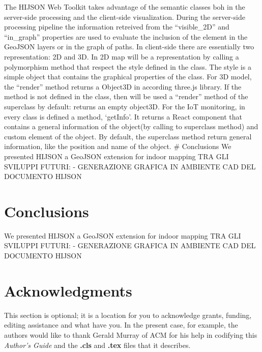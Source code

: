 \documentclass{sig-alternate}
\begin{document}
The HIJSON Web Toolkit takes advantage of the semantic classes boh in
the server-side processing and the client-side visualization. During the
server-side processing pipeline the information retreived from the
``visible\_2D'' and ``in\_graph'' properties are used to evaluate the
inclusion of the element in the GeoJSON layers or in the graph of paths.
In client-side there are essentially two representation: 2D and 3D. In
2D map will be a representation by calling a polymorphism method that
respect the style defined in the class. The style is a simple object
that contains the graphical properties of the class. For 3D model, the
``render'' method returns a Object3D in according three.js library. If
the method is not defined in the class, then will be used a ``render''
method of the superclass by default: returns an empty object3D. For the
IoT monitoring, in every class is defined a method, `getInfo'. It
returns a React component that contains a general information of the
object(by calling to superclass method) and custom element of the
object. By default, the superclass method return general information,
like the position and name of the object. \# Conclusions We presented
HIJSON a GeoJSON extension for indoor mapping TRA GLI SVILUPPI FUTURI: -
GENERAZIONE GRAFICA IN AMBIENTE CAD DEL DOCUMENTO HIJSON

\section{Conclusions}\label{conclusions}

We presented HIJSON a GeoJSON extension for indoor mapping
TRA GLI SVILUPPI FUTURI:
- GENERAZIONE GRAFICA IN AMBIENTE CAD DEL DOCUMENTO HIJSON

\section{Acknowledgments}
This section is optional; it is a location for you
to acknowledge grants, funding, editing assistance and
what have you.  In the present case, for example, the
authors would like to thank Gerald Murray of ACM for
his help in codifying this \emph{Author's Guide}
and the \textbf{.cls} and \textbf{.tex} files that it describes.

%

%
%
\appendix
\end{document}
